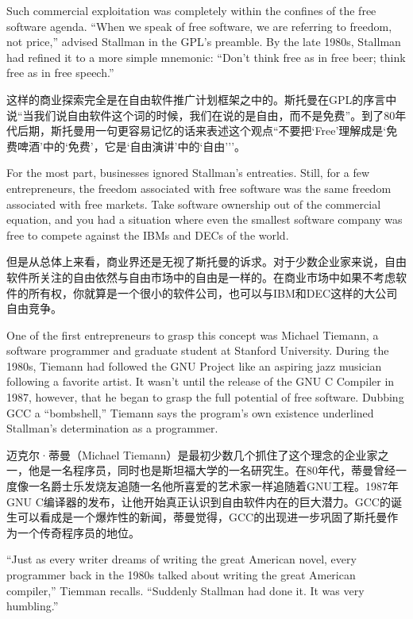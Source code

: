 \ifdefined\eng
Such commercial exploitation was completely within the confines of the free software agenda. ``When we speak of free software, we are referring to freedom, not price,'' advised Stallman in the GPL's preamble. By the late 1980s, Stallman had refined it to a more simple mnemonic: ``Don't think free as in free beer; think free as in free speech.''
\fi

\ifdefined\chs
这样的商业探索完全是在自由软件推广计划框架之中的。斯托曼在GPL的序言中说``当我们说自由软件这个词的时候，我们在说的是自由，而不是免费''。到了80年代后期，斯托曼用一句更容易记忆的话来表述这个观点``不要把`Free'理解成是`免费啤酒'中的`免费'，它是`自由演讲'中的`自由'\hspace{0.01in}''。
\fi

\ifdefined\eng
For the most part, businesses ignored Stallman's entreaties. Still, for a few entrepreneurs, the freedom associated with free software was the same freedom associated with free markets. Take software ownership out of the commercial equation, and you had a situation where even the smallest software company was free to compete against the IBMs and DECs of the world.
\fi

\ifdefined\chs
但是从总体上来看，商业界还是无视了斯托曼的诉求。对于少数企业家来说，自由软件所关注的自由依然与自由市场中的自由是一样的。在商业市场中如果不考虑软件的所有权，你就算是一个很小的软件公司，也可以与IBM和DEC这样的大公司自由竞争。
\fi

\ifdefined\eng
One of the first entrepreneurs to grasp this concept was Michael Tiemann, a software programmer and graduate student at Stanford University. During the 1980s, Tiemann had followed the GNU Project like an aspiring jazz musician following a favorite artist. It wasn't until the release of the GNU C Compiler in 1987, however, that he began to grasp the full potential of free software. Dubbing GCC a ``bombshell,'' Tiemann says the program's own existence underlined Stallman's determination as a programmer.
\fi

\ifdefined\chs
迈克尔·蒂曼（Michael Tiemann）是最初少数几个抓住了这个理念的企业家之一，他是一名程序员，同时也是斯坦福大学的一名研究生。在80年代，蒂曼曾经一度像一名爵士乐发烧友追随一名他所喜爱的艺术家一样追随着GNU工程。1987年GNU C编译器的发布，让他开始真正认识到自由软件内在的巨大潜力。GCC的诞生可以看成是一个爆炸性的新闻，蒂曼觉得，GCC的出现进一步巩固了斯托曼作为一个传奇程序员的地位。
\fi

\ifdefined\eng
``Just as every writer dreams of writing the great American novel, every programmer back in the 1980s talked about writing the great American compiler,'' Tiemman recalls. ``Suddenly Stallman had done it. It was very humbling.''
\fi

